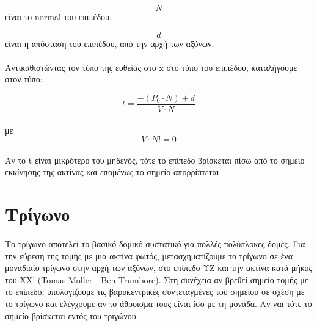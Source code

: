 \begin{sloppypar}
\begin{equation}
N
\end{equation}
είναι το normal του επιπέδου.

\begin{equation}
d
\end{equation}
είναι η απόσταση του επιπέδου, από την αρχή των αξόνων.

\paragraph{}
Αντικαθιστώντας τον τύπο της ευθείας στο x στο τύπο του επιπέδου, καταλήγουμε στον τύπο:

\begin{equation}
t = \frac{- ( P_0 \cdot N ) + d}{V \cdot N}
\end{equation}
\paragraph{}
με\\

\begin{equation}
V \cdot N != 0
\end{equation}
\paragraph{}
Αν το t είναι μικρότερο του μηδενός, τότε το επίπεδο βρίσκεται πίσω από το σημείο εκκίνησης της ακτίνας και επομένως το σημείο 
απορρίπτεται.


\section{Τρίγωνο}
\paragraph{}
	Το τρίγωνο αποτελεί το βασικό δομικό συστατικό για πολλές πολύπλοκες δομές. Για την εύρεση της τομής με μια ακτίνα φωτός,
μετασχηματίζουμε το τρίγωνο σε ένα μοναδιαίο τρίγωνο στην αρχή των αξόνων, στο επίπεδο ΥΖ και την ακτίνα κατά μήκος του ΧΧ'
(Tomas Moller - Ben Trumbore). Στη συνέχεια αν βρεθεί σημείο τομής με το επίπεδο, υπολογίζουμε τις βαρυκεντρικές συντεταγμένες
του σημείου σε σχέση με το τρίγωνο και ελέγχουμε αν το άθροισμα τους είναι ίσο με τη μονάδα. Αν ναι τότε το σημείο βρίσκεται εντός
του τριγώνου.

\end{sloppypar}

